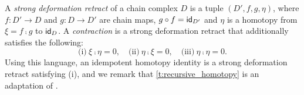 \begin{remark*}
	A \emph{strong deformation retract} \cite{Lambe-Stasheff} of a chain complex $D$ is a tuple $(D',f,g,\eta)$, where $f\colon D' \to D$ and $g\colon D\to D'$ are chain maps, $g \mathbin{\circ} f = \mathsf{id}_{D'}$ and $\eta$ is a homotopy from $\xi=f \comp g$ to $\mathsf{id}_D$. A \emph{contraction} \cite{EML,gonzalez2003computation} is a strong deformation retract that additionally satisfies the following:
	\[
	\text{(i)}\ \xi \comp \eta = 0, \quad
	\text{(ii)}\ \eta \comp \xi = 0, \quad
	\text{(iii)}\ \eta \comp \eta = 0.
	\]
	Using this language, an idempotent homotopy identity is a strong deformation retract satisfying (i), and we remark that \cref{t:recursive_homotopy} is an adaptation of \cite[p.367]{Lambe-Stasheff}.
\end{remark*}
%
%
%

